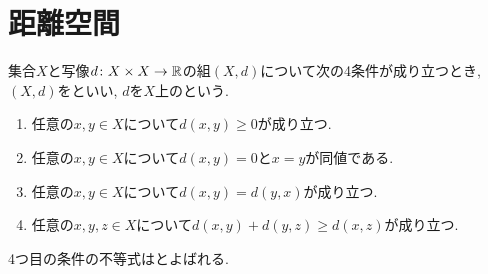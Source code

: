 \documentclass[uplatex, dvipdfmx, a4paper, 12pt, class=jsbook, crop=false]{standalone}
\begin{document}
\section{距離空間}
\label{sec:metric-spaces}

\begin{definition}
	集合$ X $と写像$ d \colon X \times X \to \mathbb{R} $の組$ (X, d) $について次の4条件が成り立つとき,
	$ (X, d) $をといい,
	$ d $を$ X $上のという.
	\begin{enumerate}
		\item 任意の$ x, y \in X $について$ d(x, y) \geq 0 $が成り立つ.
  		\item 任意の$ x, y \in X $について$ d(x, y) = 0 $と$ x = y $が同値である.
    	\item 任意の$ x, y \in X $について$ d(x, y) = d(y, x) $が成り立つ.
     	\item 任意の$ x, y, z \in X $について$ d(x, y) + d(y, z) \geq d(x, z) $が成り立つ.
	\end{enumerate}
	4つ目の条件の不等式はとよばれる.
\end{definition}
\end{document}
